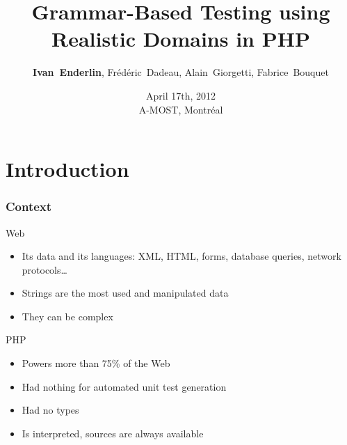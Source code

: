 \documentclass[9pt]{beamer}
\title{Grammar-Based Testing using \\ Realistic Domains in PHP}
\author{
    \textbf{Ivan~Enderlin},
    Frédéric~Dadeau,
    Alain~Giorgetti,
    Fabrice~Bouquet
}
\date{
    April 17th, 2012 \\
    A-MOST, Montréal
}
\begin{document}
\maketitle

\section{Introduction}

\begin{frame}
\frametitle{Context}

\begin{block}{Web}
\begin{itemize}
\item Its data and its languages: XML, HTML, forms, database queries,
network protocols…
\item Strings are the most used and manipulated data
\item They can be complex
\end{itemize}
\end{block}

\begin{block}{PHP}
\begin{itemize}
\item Powers more than 75\% of the Web
\item Had nothing for automated unit test generation
\item Had no types
\item Is interpreted, sources are always available
\end{itemize}
\end{block}

\end{frame}
\end{document}
